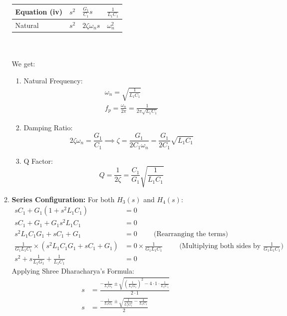 \begin{enumerate}
\begin{enumerate}
\begin{tabularx}{\linewidth}{|X|X|X|X|}
          Equation (iv) & \(s^2\) & \(\frac{G_1}{C_1} s\) & \(\frac{1}{L_1 C_1}\) \\ \hline
          Natural & \(s^2\) & \(2 \zeta \omega_n s\) & \(\omega_n^2\) \\ \hline
        \end{tabularx}\\ \\
        We get:
        \begin{enumerate}
          \item Natural Frequency:
            \begin{align*}
              \omega_n = \sqrt{\frac{1}{L_1 C_1}} \\
              f_p = \frac{\omega_n}{2\pi} = \frac{1}{2\pi \sqrt{L_1 C_1}}
            \end{align*}
          \item Damping Ratio:
            \[
              2 \zeta \omega_n = \frac{G_1}{C_1} \implies \zeta = \frac{G_1}{2C_1 \omega_n} = \frac{G_1}{2 C_1} \sqrt{L_1 C_1}
            \]
          \item Q Factor:
            \[
              Q = \frac{1}{2\zeta} = \frac{C_1}{G_1} \sqrt{\frac{1}{L_1 C_1}}
            \]
        \end{enumerate}
      \item \textbf{Series Configuration:}
        For both \(H_3(s)\) and \(H_4(s)\):
        \begin{align*}
          sC_1 + G_1(1 + s^2 L_1 C_1) &= 0 \\
          sC_1 + G_1 + G_1 s^2 L_1 C_1 &= 0 \\
          s^2 L_1 C_1 G_1 + s C_1 + G_1 &= 0 \hspace{1cm} \text{(Rearranging the terms)} \\
          \frac{1}{G_1 L_1 C_1} \times \left(s^2 L_1 C_1 G_1 + sC_1 + G_1\right) &= 0 \times \frac{1}{G_1 L_1 C_1} \hspace{1cm} \text{(Multiplying both sides by \(\frac{1}{G_1 L_1 C_1}\))} \\
          s^2 + s \frac{1}{L_1 G_1} + \frac{1}{L_1 C_1} &= 0 \tag{5}
        \end{align*}
        Applying Shree Dharacharya's Formula:
        \begin{align*}
          s &= \frac{-\frac{1}{L_1 G_1} \pm \sqrt{\left(\frac{1}{L_1 G_1}\right)^2 - 4 \cdot 1 \cdot \frac{1}{L_1 C_1}}}{2 \cdot 1} \\
          s &= \frac{-\frac{1}{L_1 G_1} \pm \sqrt{\frac{1}{L_1^2 G_1^2} - \frac{4}{L_1 C_1}}}{2} \\

\end{align*}
\end{enumerate}
\end{enumerate}
